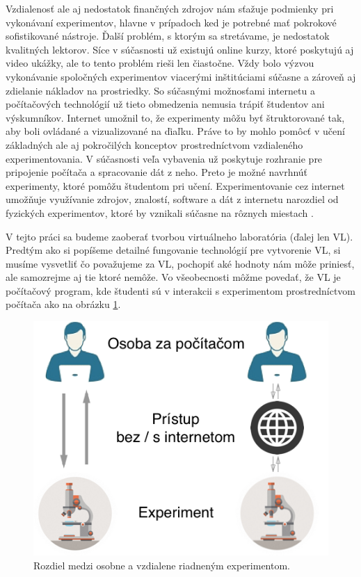 Vzdialenosť ale aj nedostatok finančných zdrojov nám sťažuje podmienky pri vykonávaní experimentov, hlavne v prípadoch ked je potrebné mať pokrokové sofistikované nástroje. Ďalší problém, s ktorým sa stretávame, je nedostatok kvalitných lektorov. Síce v súčasnosti už existujú online kurzy, ktoré poskytujú aj video ukážky, ale to tento problém rieši len čiastočne. Vždy bolo výzvou vykonávanie spoločných experimentov viacerými inštitúciami súčasne a zároveň aj zdielanie nákladov na prostriedky. So súčasnými možnosťami internetu a počítačových technológií už tieto obmedzenia nemusia trápiť študentov ani výskumníkov. Internet umožnil to, že experimenty môžu byť štruktorované tak, aby boli ovládané a vizualizované na ďiaľku. Práve to by mohlo pomôcť v učení základných ale aj pokročilých konceptov prostredníctvom vzdialeného experimentovania. V súčasnosti veľa vybavenia už poskytuje rozhranie pre pripojenie počítača a spracovanie dát z neho. Preto je možné navrhnúť experimenty, ktoré pomôžu študentom pri učení. Experimentovanie cez internet umožňuje využívanie zdrojov, znalostí, software a dát z internetu narozdiel od fyzických experimentov, ktoré by vznikali súčasne na rôznych miestach \cite{vlabphylosopfy}.

V tejto práci sa budeme zaoberať tvorbou virtuálneho laboratória (ďalej len VL). Predtým ako si popíšeme detailné fungovanie technológií pre vytvorenie VL, si musíme vysvetliť čo považujeme za VL, pochopiť aké hodnoty nám môže priniesť, ale samozrejme aj tie ktoré nemôže. Vo všeobecnosti môžme povedať, že VL je počítačový program, kde študenti sú v interakcii s experimentom prostredníctvom počítača ako na obrázku \ref{img-real-vs-remote}. 

\begin{figure}[H]
  \centering
  \includegraphics[scale=0.40]{img/VL_vs_real.png}
  \caption{Rozdiel medzi osobne a vzdialene riadneným experimentom.}
  \label{img-real-vs-remote}
\end{figure}


